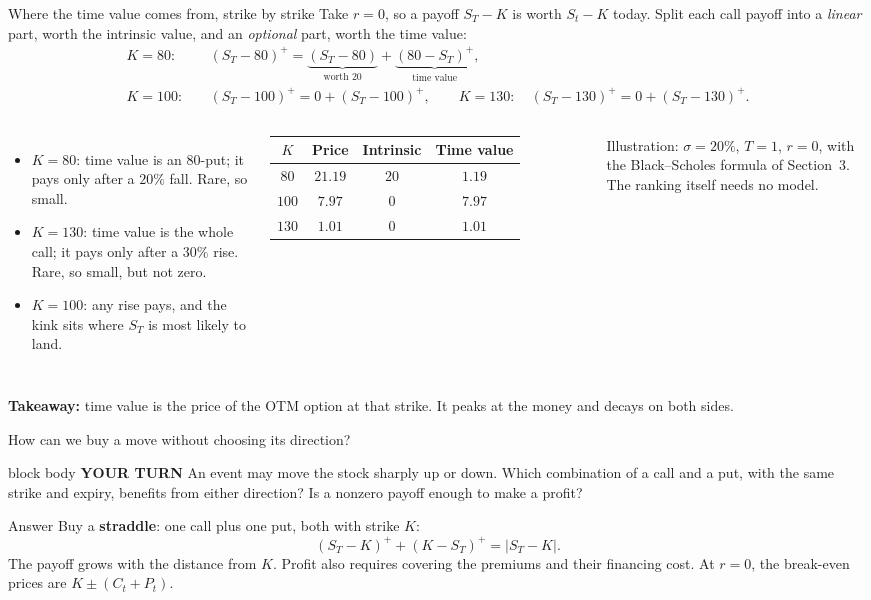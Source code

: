 \documentclass[handout,10pt,aspectratio=169]{beamer}
\newenvironment{pausebox}{\begin{beamercolorbox}[rounded=true,sep=0.8em,wd=\textwidth]{block body}
  \textbf{\color{CourseGold}YOUR TURN}\quad}{\end{beamercolorbox}}
\newcommand{\1}{\mathbf 1}
\begin{document}
\begin{frame}[shrink=5]{Where the time value comes from, strike by strike}
\small
Take \(r=0\), so a payoff \(S_T-K\) is worth \(S_t-K\) today. Split each call
payoff into a \emph{linear} part, worth the intrinsic value, and an
\emph{optional} part, worth the time value:
\[
\begin{aligned}
K=80:&\quad (S_T-80)^+=\underbrace{(S_T-80)}_{\text{worth }20}+\underbrace{(80-S_T)^+}_{\text{time value}},\\[-2pt]
K=100:&\quad (S_T-100)^+=0+(S_T-100)^+,\qquad
K=130:\quad (S_T-130)^+=0+(S_T-130)^+.
\end{aligned}
\]
\begin{columns}[T,onlytextwidth]
\begin{itemize}
\item \(K=80\): time value is an \(80\)-put; it pays only after a
      \(20\%\) fall. Rare, so small.
\item \(K=130\): time value is the whole call; it pays only after a
      \(30\%\) rise. Rare, so small, but not zero.
\item \(K=100\): any rise pays, and the kink sits where \(S_T\) is most
      likely to land.
\end{itemize}
\centering
\begin{tabular}{c|ccc}
\toprule
\(K\) & Price & Intrinsic & Time value\\
\midrule
\(80\)  & \(21.19\) & \(20\) & \(1.19\)\\
\(100\) & \(7.97\)  & \(0\)  & \(\mathbf{7.97}\)\\
\(130\) & \(1.01\)  & \(0\)  & \(1.01\)\\
\bottomrule
\end{tabular}
\par\smallskip
{\scriptsize\raggedright Illustration: \(\sigma=20\%\), \(T=1\), \(r=0\), with the
Black--Scholes formula of Section~3. The ranking itself needs no model.\par}
\end{columns}
\smallskip
\textbf{Takeaway:} time value is the price of the OTM option at that strike.
It peaks at the money and decays on both sides.
\end{frame}

\begin{frame}{How can we buy a move without choosing its direction?}
\begin{pausebox}
An event may move the stock sharply up or down. Which combination of a call
and a put, with the same strike and expiry, benefits from either direction?
Is a nonzero payoff enough to make a profit?
\end{pausebox}

\begin{exampleblock}{Answer}
Buy a \textbf{straddle}: one call plus one put, both with strike \(K\):
\[
(S_T-K)^+ + (K-S_T)^+=\boxed{|S_T-K|}.
\]
The payoff grows with the distance from \(K\). Profit also requires covering
the premiums and their financing cost. At \(r=0\), the break-even prices are
\(K\pm(C_t+P_t)\).
\end{exampleblock}
\end{frame}
\end{document}
